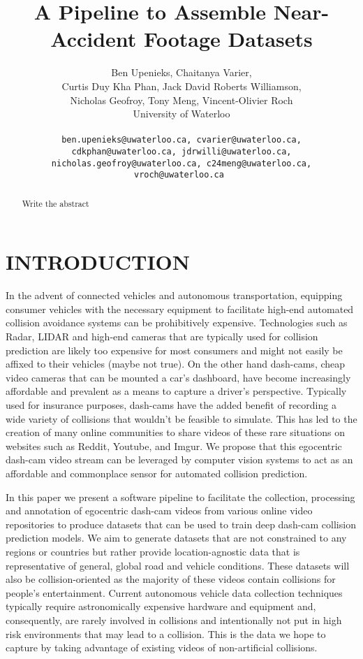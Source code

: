 \documentclass[letterpaper, 10 pt, conference]{IEEEconf}
\title{\LARGE \bf
A Pipeline to Assemble Near-Accident Footage Datasets
}
\author{
         Ben Upenieks, Chaitanya Varier,\\
         Curtis Duy Kha Phan, Jack David Roberts Williamson,\\
         Nicholas Geofroy, Tony Meng, Vincent-Olivier Roch\\
         University of Waterloo\\
         \\
         \tt\small ben.upenieks@uwaterloo.ca, cvarier@uwaterloo.ca,
         \\ \tt\small cdkphan@uwaterloo.ca, jdrwilli@uwaterloo.ca,
         \\ \tt\small nicholas.geofroy@uwaterloo.ca, c24meng@uwaterloo.ca, vroch@uwaterloo.ca
}
\newcommand{\todo}[1]{{\color{red}#1}}
\begin{document}
\maketitle
\thispagestyle{empty}
\pagestyle{empty}


\begin{abstract}

\todo{Write the abstract}

\end{abstract}

\section{INTRODUCTION}

In the advent of connected vehicles and autonomous transportation, equipping consumer vehicles with the necessary equipment to facilitate high-end automated collision avoidance systems can be prohibitively expensive.
Technologies such as Radar, LIDAR and high-end cameras that are typically used for collision prediction are likely too expensive for most consumers and might not easily be affixed to their vehicles (maybe not true).
On the other hand dash-cams, cheap video cameras that can be mounted a car's dashboard, have become increasingly affordable and prevalent as a means to capture a driver’s perspective.
Typically used for insurance purposes, dash-cams have the added benefit of recording a wide variety of collisions that wouldn't be feasible to simulate. 
This has led to the creation of many online communities to share videos of these rare situations on websites such as Reddit, Youtube, and Imgur.
We propose that this egocentric dash-cam video stream can be leveraged by computer vision systems to act as an affordable and commonplace sensor for automated collision prediction. 

In this paper we present a software pipeline to facilitate the collection, processing and annotation of egocentric dash-cam videos from various online video repositories to produce datasets that can be used to train deep dash-cam collision prediction models.
We aim to generate datasets that are not constrained to any regions or countries but rather provide location-agnostic data that is representative of general, global road and vehicle conditions.
These datasets will also be collision-oriented as the majority of these videos contain collisions for people's entertainment.
Current autonomous vehicle data collection techniques typically require astronomically expensive hardware and equipment and, consequently, are rarely involved in collisions and intentionally not put in high risk environments that may lead to a collision.
This is the data we hope to capture by taking advantage of existing videos of non-artificial collisions.
\end{document}
